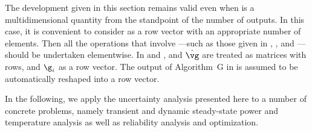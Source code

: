 \begin{remark} 
The development given in this section remains valid even when \g is a
multidimensional quantity from the standpoint of the number of outputs. In this
case, it is convenient to consider \g as a row vector with an appropriate number
of elements. Then all the operations that involve \g---such as those given in
, , and
---should be undertaken elementwise. In
 and , \vg and $\hat{\vg}$ are
treated as matrices with \nc rows, and $\g_i$ as a row vector. The output of
Algorithm~G in  is assumed to be automatically reshaped
into a row vector.
\end{remark}

In the following, we apply the uncertainty analysis presented here to a number
of concrete problems, namely transient and dynamic steady-state power and
temperature analysis as well as reliability analysis and optimization.
